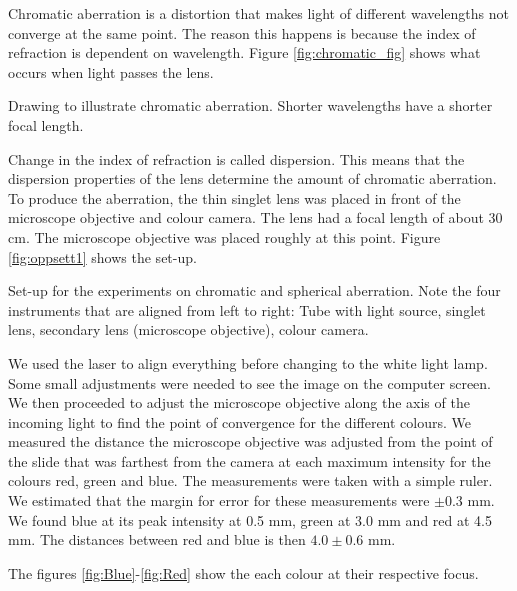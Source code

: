 Chromatic aberration is a distortion that makes light of different wavelengths not converge at the same point. The reason this happens is because the index of refraction is dependent on wavelength. Figure \vref{fig:chromatic_fig} shows what occurs when light passes the lens.

    {Drawing to illustrate chromatic aberration.
    Shorter wavelengths have a shorter focal length.}

 Change in the index of refraction is called dispersion. This means that the dispersion properties of the lens determine the amount of chromatic aberration. To produce the aberration, the thin singlet lens was placed in front of the microscope objective and colour camera. The lens had a focal length of about 30 cm. The microscope objective was placed roughly at this point. Figure \vref{fig:oppsett1} shows the set-up. 

    {Set-up for the experiments on chromatic and spherical aberration. Note
    the four instruments that are aligned from left to right: Tube with
    light source, singlet lens, secondary lens (microscope objective), colour
    camera.}

We used the laser to align everything before changing to the white light lamp. Some small adjustments were needed to see the image on the computer screen. We then proceeded to adjust the microscope objective along the axis of the incoming light to find the point of convergence for the different colours. We measured the distance the microscope objective was adjusted from the point of the slide that was farthest from the camera at each maximum intensity for the colours red, green and blue. The measurements were taken with a simple ruler. We estimated that the margin for error for these measurements were $\pm 0.3$ mm. We found blue at its peak intensity at 0.5 mm, green at 3.0 mm and red at 4.5 mm. The distances between red and blue is then $4.0 \pm 0.6$ mm.


The figures \vref{fig:Blue}-\vref{fig:Red} show the each colour at their respective focus.

